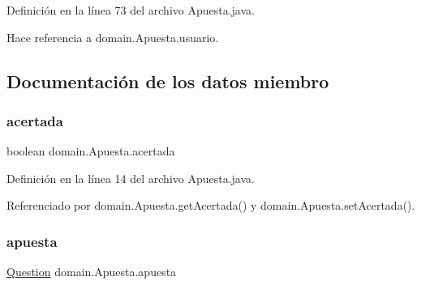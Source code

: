 Definición en la línea 73 del archivo Apuesta.\+java.


\begin{DoxyCode}{0}

\end{DoxyCode}


Hace referencia a domain.\+Apuesta.\+usuario.



\subsection{Documentación de los datos miembro}
\mbox{\label{classdomain_1_1Apuesta_a8adfa2717f26eeac6e6b9df3985f3a57}} 
\subsubsection{\texorpdfstring{acertada}{acertada}}
{\footnotesize\ttfamily boolean domain.\+Apuesta.\+acertada\hspace{0.3cm}{\ttfamily [private]}}



Definición en la línea 14 del archivo Apuesta.\+java.



Referenciado por domain.\+Apuesta.\+get\+Acertada() y domain.\+Apuesta.\+set\+Acertada().

\mbox{\label{classdomain_1_1Apuesta_a43e71ee854e8e8b1447a707fc749d34b}} 
\subsubsection{\texorpdfstring{apuesta}{apuesta}}
{\footnotesize\ttfamily \mbox{\hyperlink{classdomain_1_1Question}{Question}} domain.\+Apuesta.\+apuesta\hspace{0.3cm}{\ttfamily [private]}}



